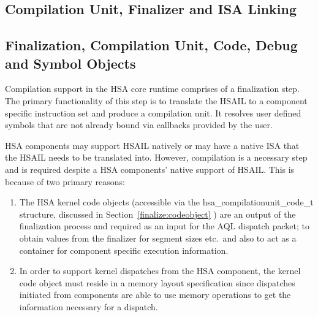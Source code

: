 \documentclass{book}
\newcommand{\reftyp}[1]{#1}
\begin{document}

%

\begin{appendices}

\chapter{Compilation Unit, Finalizer and ISA Linking}
\label{finalizerchapter} \hypertarget{finalizerchapter}{}
\hypertarget{finalizer}{}\section{Finalization, Compilation Unit,
Code, Debug and Symbol Objects}\label{finalizer}

Compilation support in the HSA core runtime comprises of a
finalization step. The primary functionality of this step is to
translate the HSAIL to a component specific instruction set and
produce a compilation unit. It resolves user defined symbols that
are not already bound via callbacks provided by the user.

HSA components may support HSAIL natively or may have a native ISA
that the HSAIL needs to be translated into. However, compilation is a
necessary step and is required despite a HSA components' native support
of HSAIL. This is because of two primary reasons:

\begin{enumerate}
\item  The HSA kernel code objects (accessible via the
\reftyp{hsa\_compilationunit\_code\_t} structure, discussed in
Section~\ref{finalize:codeobject} ) are an output of the
finalization process and required as an input for the AQL dispatch
packet; to obtain values from the finalizer for segment sizes etc.\
and also to act as a container for component specific execution
information.

\item In order to support kernel dispatches from the HSA
component, the kernel code object must reside in a memory layout
specification since dispatches initiated from components are able
to use memory operations to get the information necessary for a
dispatch.
\end{enumerate}


\end{appendices}
\end{document}
